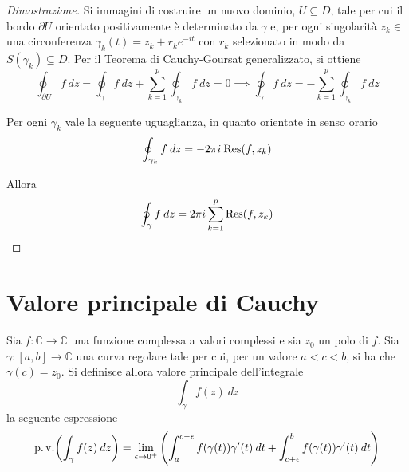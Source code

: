            \begin{proof}[Dimostrazione]
                Si immagini di costruire un nuovo dominio, $U \subseteq D$, tale per cui il bordo $\partial U$ orientato positivamente è determinato da $\gamma$ e, per ogni singolarità $z_{k} \in $ una circonferenza $\gamma_{k}(t) = z_{k} + r_{k}e^{-it}$ con $r_{k}$ selezionato in modo da $S(\gamma_{k}) \subseteq D$.
                Per il Teorema di Cauchy-Goursat generalizzato, si ottiene
                \[
                    \oint_{\partial U} f \: dz = \oint_{\gamma} f \: dz + \sum_{k = 1}^{p} \oint_{\gamma_{k}} f \: dz = 0 \implies \oint_{\gamma} f \: dz = - \sum_{k = 1}^{p} \oint_{\gamma_{k}} f \: dz
                \]

                Per ogni $\gamma_{k}$ vale la seguente uguaglianza, in quanto orientate in senso orario
                \[
                    \oint_{\gamma_{k}} f \: dz = - 2 \pi i \: \textnormal{Res}(f, z_{k})
                \]

                Allora
                \[
                    \oint_{\gamma} f \: dz = 2 \pi i \sum_{k = 1}^{p} \textnormal{Res}(f, z_{k})
                \]
            \end{proof}


\section{Valore principale di Cauchy}
        \begin{definition}
            Sia $f: \mathbb{C} \rightarrow \mathbb{C}$ una funzione complessa a valori complessi e sia $z_{0}$ un polo di $f$.
            Sia $\gamma: [a, b] \rightarrow \mathbb{C}$ una curva regolare tale per cui, per un valore $a < c < b$, si ha che $\gamma(c) = z_{0}$.
            Si definisce allora valore principale dell'integrale
            \[
                \int_{\gamma} f(z) \: dz
            \]
            la seguente espressione
            \[
                \operatorname{p.v.}\!\left(\int_{\gamma} f(z) \: dz\right) = \lim_{\epsilon \rightarrow 0^{+}} \left( \int_{a}^{c - \epsilon} f(\gamma(t)) \gamma'(t) \: dt + \int_{c + \epsilon}^{b} f(\gamma(t)) \gamma'(t) \: dt\right)
            \]
        \end{definition}
